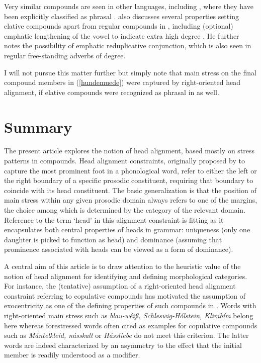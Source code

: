 \documentclass[output=paper
 ,nobabel
 ,draftmode
 ,colorlinks, citecolor=brown
]{langscibook}
\begin{document}
\noindent
Very similar compounds are seen in other languages, including , where they have been explicitly
classified as phrasal \citep[157--158]{TrommelenZonneveld1986}. \citet{Hoeksema2012} also discusses
several properties setting elative compounds apart from regular compounds in , including
(optional) emphatic lengthening of the vowel to indicate extra high degree
\citep[98]{Hoeksema2012}. He further notes the possibility of emphatic reduplicative conjunction,
which is also seen in regular free-standing adverbs of degree.  

I will not pursue this matter further but simply note that main stress on the final compound members in (\ref{hundemuede}) were captured by right-oriented head alignment, if elative compounds were recognized as phrasal in  as well. 

\section{Summary}\label{sec-conclu-rf}

The present article explores the notion of head alignment, based mostly on stress patterns in  compounds. Head alignment constraints, originally proposed by \citet{McCarthyPrince1993} to capture the most prominent foot in a phonological word, refer to either the left or the right boundary of a specific prosodic constituent, requiring that boundary to coincide with its head constituent. The basic generalization is that the position of main stress within any given prosodic domain always refers to one of the margins, the choice among which is determined by the category of the relevant domain. Reference to the term `head' in this alignment constraint is fitting as it encapsulates both central properties of heads in grammar: uniqueness (only one daughter is picked to function as head) and dominance (assuming that prominence associated with heads can be viewed as a form of dominance).
 
A central aim of this article is to draw attention to the heuristic value of the notion of head alignment for identifying and defining morphological categories. For instance, the (tentative) assumption of a right-oriented head alignment constraint referring to copulative compounds has motivated the assumption of exocentricity as one of the defining properties of such compounds in . Words with right-oriented main stress such as \emph{blau-wéiß, Schleswig-Hólstein, Klimbím} belong here whereas forestressed words often cited as examples for copulative compounds such as \emph{Mántelkleid, násskalt} or \emph{Hássliebe} do not meet this criterion. The latter words are indeed characterized by an asymmetry to the effect that the initial member is readily understood as a modifier. 
\end{document}
